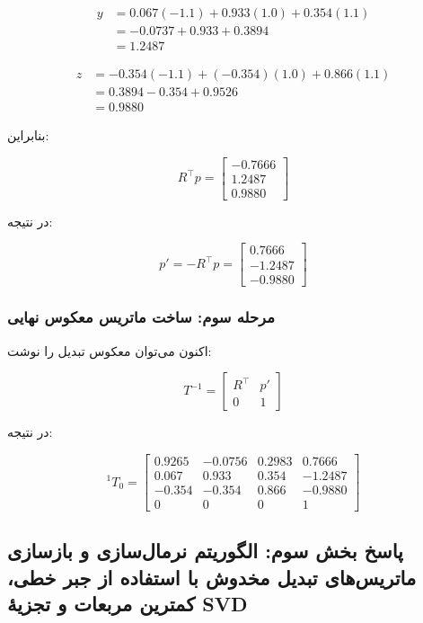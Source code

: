 \documentclass{article}
\begin{document}
\[
\begin{aligned}
	y &= 0.067(-1.1) + 0.933(1.0) + 0.354(1.1) \\
	&= -0.0737 +0.933 +0.3894 \\
	&= 1.2487
\end{aligned}
\]

\[
\begin{aligned}
	z &= -0.354(-1.1) + (-0.354)(1.0) + 0.866(1.1) \\
	&= 0.3894 -0.354 +0.9526 \\
	&= 0.9880
\end{aligned}
\]

بنابراین:

\[
R^\top p =
\begin{bmatrix}
	-0.7666\\
	1.2487\\
	0.9880
\end{bmatrix}
\]

در نتیجه:

\[
p'=-R^\top p=
\begin{bmatrix}
	0.7666\\
	-1.2487\\
	-0.9880
\end{bmatrix}
\]

\subsubsection{مرحله سوم: ساخت ماتریس معکوس نهایی}

اکنون می‌توان معکوس تبدیل را نوشت:

\[
T^{-1}=
\begin{bmatrix}
	R^\top & p'\\
	0 & 1
\end{bmatrix}
\]

در نتیجه:

\[
{}^{1}T_{0}=
\begin{bmatrix}
	0.9265 & -0.0756 & 0.2983 & 0.7666\\
	0.067 & 0.933 & 0.354 & -1.2487\\
	-0.354 & -0.354 & 0.866 & -0.9880\\
	0 & 0 & 0 & 1
\end{bmatrix}
\]


\subsection{پاسخ بخش سوم: الگوریتم نرمال‌سازی و بازسازی ماتریس‌های تبدیل مخدوش با استفاده از جبر خطی، کمترین مربعات و تجزیهٔ SVD}
\end{document}
